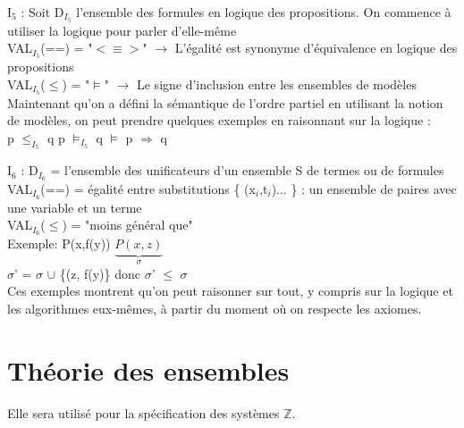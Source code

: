 
I$_{5}$ : Soit D$_{I_{5}}$ l'ensemble des formules en logique des propositions. On commence à utiliser la logique pour parler d'elle-même\\
VAL$_{I_{5}}$(==) = "$<\equiv>$" $\rightarrow$ L'égalité est synonyme d'équivalence en logique des propositions\\
VAL$_{I_{5}}$($\leq$) = "$\models$" $\rightarrow$ Le signe d'inclusion entre les ensembles de modèles\\
Maintenant qu'on a défini la sémantique de l'ordre partiel en utilisant la notion de modèles, on peut prendre quelques exemples en raisonnant sur la logique :\\
\newline
p $\leq_{I_{5}}$ q   \hspace{1.5cm} p $\models_{I_{5}}$ q \hspace{1.5cm} $\models$ p $\Rightarrow$ q\\
\newline

I$_{6}$ : D$_{I_{6}}$ = l'ensemble des unificateurs d'un ensemble S de termes ou de formules\\
VAL$_{I_{6}}$(==) = égalité entre substitutions \{ (x$_{i}$,t$_{i}$)... \} : un ensemble de paires avec une variable et un terme\\
VAL$_{I_{6}}$($\leq$) = "moins général que"\\
\newline
Exemple: P(x,f(y)) \hspace{1cm} $\underbrace{P(x,z)}_{\sigma}$\\
$\sigma$' = $\sigma$ $\cup$ \{(z, f(y)\} donc 
$\sigma$' $\leq$ $\sigma$\\

Ces exemples montrent qu'on peut raisonner sur tout, y compris sur la logique et les algorithmes eux-mêmes, à partir du moment où on respecte les axiomes.

\section{Théorie des ensembles}
Elle sera utilisé pour la spécification des systèmes $\mathbb{Z}$.\\

